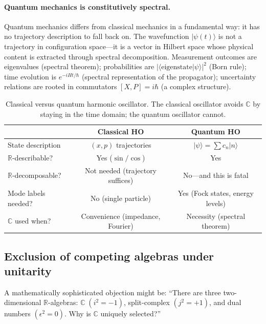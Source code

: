 \documentclass[aps,pra,preprint,groupedaddress,amsmath,amssymb,floatfix]{revtex4-2}
\begin{document}
\paragraph{Quantum mechanics is constitutively spectral.} Quantum mechanics differs from classical mechanics in a fundamental way: it has no trajectory description to fall back on. The wavefunction $|\psi(t)\rangle$ is not a trajectory in configuration space---it is a vector in Hilbert space whose physical content is extracted through spectral decomposition. Measurement outcomes are eigenvalues (spectral theorem); probabilities are $|\langle\text{eigenstate}|\psi\rangle|^2$ (Born rule); time evolution is $e^{-iHt/\hbar}$ (spectral representation of the propagator); uncertainty relations are rooted in commutators $[X,P] = i\hbar$ (a complex structure).

\begin{table}[t]
\caption{Classical versus quantum harmonic oscillator. The classical oscillator avoids $\mathbb{C}$ by staying in the time domain; the quantum oscillator cannot.}
\label{tab:HO_comparison}
\begin{ruledtabular}
\begin{tabular}{lcc}
& Classical HO & Quantum HO \\
\hline
State description & $(x,p)$ trajectories & $|\psi\rangle = \sum c_n |n\rangle$ \\
$\mathbb{R}$-describable? & Yes ($\sin/\cos$) & Yes \\
$\mathbb{R}$-decomposable? & Not needed (trajectory suffices) & No---and this is fatal \\
Mode labels needed? & No (single particle) & Yes (Fock states, energy levels) \\
$\mathbb{C}$ used when? & Convenience (impedance, Fourier) & Necessity (spectral theorem) \\
\end{tabular}
\end{ruledtabular}
\end{table}

\subsection{Exclusion of competing algebras under unitarity}
\label{sec:th1_algebra}

A mathematically sophisticated objection might be: ``There are three two-dimensional $\mathbb{R}$-algebras: $\mathbb{C}\;(i^2 = -1)$, split-complex $(j^2 = +1)$, and dual numbers $(\epsilon^2 = 0)$. Why is $\mathbb{C}$ uniquely selected?''
\end{document}
